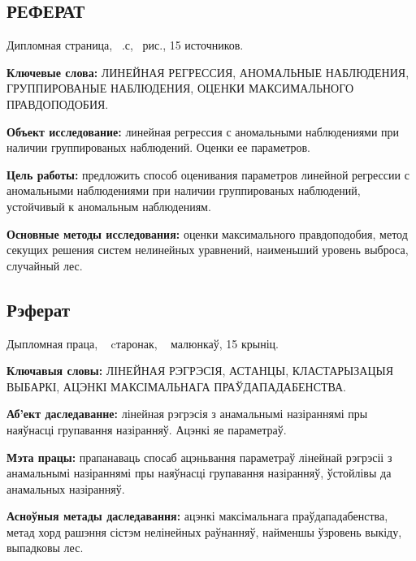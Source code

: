 \begin{center}
    \section*{РЕФЕРАТ}
\end{center}

Дипломная страница, ~.с, ~рис., 15 источников.

\textbf{Ключевые слова:} ЛИНЕЙНАЯ РЕГРЕССИЯ, АНОМАЛЬНЫЕ НАБЛЮДЕНИЯ, ГРУППИРОВАНЫЕ НАБЛЮДЕНИЯ, ОЦЕНКИ МАКСИМАЛЬНОГО ПРАВДОПОДОБИЯ.

\textbf{Объект исследование:} линейная регрессия с аномальными наблюдениями при наличии группированых наблюдений. Оценки ее параметров.

\textbf{Цель работы:} предложить способ оценивания параметров линейной регрессии с аномальными наблюдениями при наличии группированых наблюдений, устойчивый к аномальным наблюдениям.

\textbf{Основные методы исследования:} оценки максимального правдоподобия, метод секущих решения систем нелинейных уравнений, наименьший уровень выброса, случайный лес.

\newpage

\begin{otherlanguage}{belarusian}

\begin{center}
    \section*{Рэферат}
\end{center}
Дыпломная праца, ~ cтаронак, ~ малюнкаў, 15 крыніц.

\textbf{Ключавыя словы:}  ЛІНЕЙНАЯ РЭГРЭСІЯ, АСТАНЦЫ, КЛАСТАРЫЗАЦЫЯ ВЫБАРКІ, АЦЭНКІ МАКСІМАЛЬНАГА ПРАЎДАПАДАБЕНСТВА.

\textbf{Аб'ект даследаванне:} лінейная рэгрэсія з анамальнымі назіраннямі пры наяўнасці групавання назіранняў. Ацэнкі яе параметраў.

\textbf{Мэта працы:} прапанаваць спосаб ацэньвання параметраў лінейнай рэгрэсіі з анамальнымі назіраннямі пры наяўнасці групавання назіранняў, ўстойлівы да анамальных назіранняў.

\textbf{Асноўныя метады даследавання:} ацэнкі максімальнага праўдападабенства, метад хорд рашэння сістэм нелінейных раўнанняў, найменшы ўзровень выкіду, выпадковы лес.

\end{otherlanguage}

